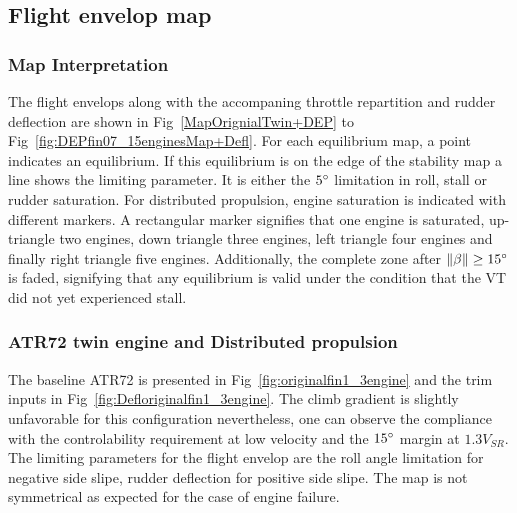 \clearpage
\subsection{Flight envelop map}
\subsubsection{Map Interpretation}\label{MapInterpretation}
The flight envelops along with the accompaning throttle repartition and rudder deflection are shown in Fig~\ref{MapOrignialTwin+DEP} to Fig~\ref{fig:DEPfin07_15enginesMap+Defl}. For each equilibrium map, a point indicates an equilibrium. If this equilibrium is on the edge of the stability map a line shows the limiting parameter. It is either the $5\degree$ limitation in roll, stall or rudder saturation.
For distributed propulsion, engine saturation is indicated with different markers. A rectangular marker signifies that one engine is saturated, up-triangle two engines, down triangle three engines, left triangle four engines and finally right triangle five engines.
Additionally, the complete zone after $\|\beta\|\geq 15\degree$ is faded, signifying that any equilibrium is valid under the condition that the VT did not yet experienced stall.

\subsubsection{ATR72 twin engine and Distributed propulsion}

The baseline ATR72 is presented in Fig~\ref{fig:originalfin1_3engine} and the trim inputs in Fig~\ref{fig:Defloriginalfin1_3engine}.
The climb gradient is slightly unfavorable for this configuration nevertheless, one can observe the compliance with the controlability requirement at low velocity and the $15\degree$ margin at $1.3V_{SR}$. The limiting parameters for the flight envelop are the roll angle limitation for negative side slipe, rudder deflection for positive side slipe. The map is not symmetrical as expected for the case of engine failure.

